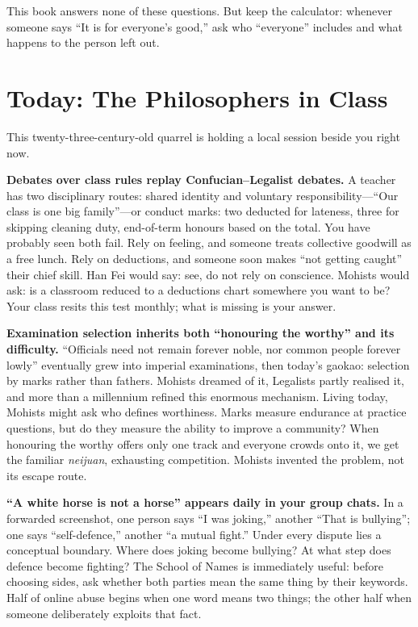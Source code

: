 This book answers none of these questions. But keep the calculator: whenever someone says ``It is for everyone's good,'' ask who ``everyone'' includes and what happens to the person left out.

\section{Today: The Philosophers in Class}
This twenty-three-century-old quarrel is holding a local session beside you right now.

\textbf{Debates over class rules replay Confucian--Legalist debates.} A teacher has two disciplinary routes: shared identity and voluntary responsibility---``Our class is one big family''---or conduct marks: two deducted for lateness, three for skipping cleaning duty, end-of-term honours based on the total. You have probably seen both fail. Rely on feeling, and someone treats collective goodwill as a free lunch. Rely on deductions, and someone soon makes ``not getting caught'' their chief skill. Han Fei would say: see, do not rely on conscience. Mohists would ask: is a classroom reduced to a deductions chart somewhere you want to be? Your class resits this test monthly; what is missing is your answer.

\textbf{Examination selection inherits both ``honouring the worthy'' and its difficulty.} ``Officials need not remain forever noble, nor common people forever lowly'' eventually grew into imperial examinations, then today's gaokao: selection by marks rather than fathers. Mohists dreamed of it, Legalists partly realised it, and more than a millennium refined this enormous mechanism. Living today, Mohists might ask who defines worthiness. Marks measure endurance at practice questions, but do they measure the ability to improve a community? When honouring the worthy offers only one track and everyone crowds onto it, we get the familiar \textit{neijuan}, exhausting competition. Mohists invented the problem, not its escape route.

\textbf{``A white horse is not a horse'' appears daily in your group chats.} In a forwarded screenshot, one person says ``I was joking,'' another ``That is bullying''; one says ``self-defence,'' another ``a mutual fight.'' Under every dispute lies a conceptual boundary. Where does joking become bullying? At what step does defence become fighting? The School of Names is immediately useful: before choosing sides, ask whether both parties mean the same thing by their keywords. Half of online abuse begins when one word means two things; the other half when someone deliberately exploits that fact.

